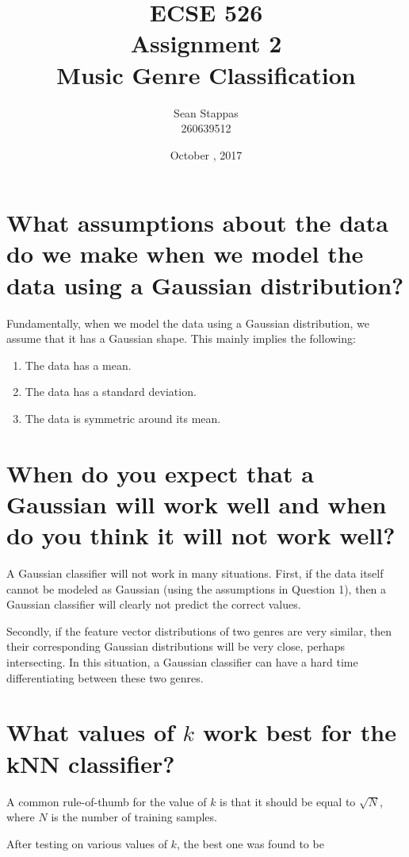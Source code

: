 \documentclass[a4paper,titlepage]{article}
\title{
	\textbf{ECSE 526 \\ Assignment 2}
	\\ \large Music Genre Classification
}
\author{Sean Stappas \\ 260639512}
\date{October \nth{19}, 2017}
\begin{document}
	\sloppy
	\maketitle
	\twocolumn
	
	\section{What assumptions about the data do we make when we model the data using a Gaussian distribution?}
	
	Fundamentally, when we model the data using a Gaussian distribution, we assume that it has a Gaussian shape. This mainly implies the following:
	
	\begin{enumerate}
		\item The data has a mean.
		\item The data has a standard deviation.
		\item The data is symmetric around its mean.
	\end{enumerate}
	
	
	\section{When do you expect that a Gaussian will work well and when do you think it will not work well?}
	
	A Gaussian classifier will not work in many situations. First, if the data itself cannot be modeled as Gaussian (using the assumptions in Question 1), then a Gaussian classifier will clearly not predict the correct values.
	
	Secondly, if the feature vector distributions of two genres are very similar, then their corresponding Gaussian distributions will be very close, perhaps intersecting. In this situation, a Gaussian classifier can have a hard time differentiating between these two genres.
	
	\section{What values of $k$ work best for the kNN classifier?}
	
	A common rule-of-thumb for the value of $k$ is that it should be equal to $\sqrt{N}$, where $N$ is the number of training samples. %
	
	After testing on various values of $k$, the best one was found to be %
	
\end{document}
